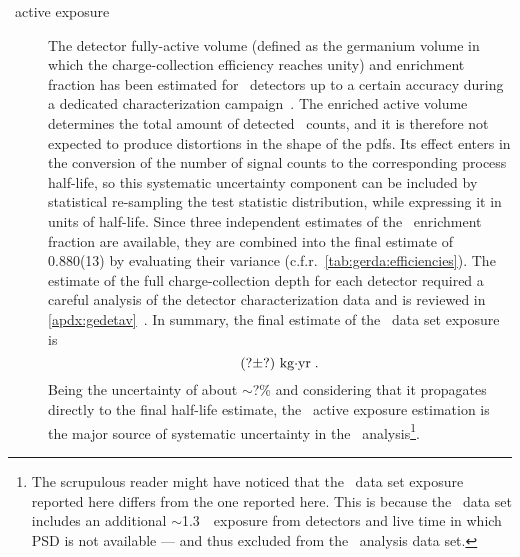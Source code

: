 \begin{description}
  \item[\gesix\ active exposure] The detector fully-active volume (defined
    as the germanium volume in which the charge-collection efficiency reaches unity) and
    enrichment fraction has been estimated for \bege\ detectors up to a certain accuracy
    during a dedicated characterization campaign~\cite{Agostini2015e, Agostini2019}. The
    enriched active volume determines the total amount of detected \nnbb\ counts, and it
    is therefore not expected to produce distortions in the shape of the pdfs. Its effect
    enters in the conversion of the number of signal counts to the corresponding process
    half-life, so this systematic uncertainty component can be included by statistical
    re-sampling the test statistic distribution, while expressing it in units of
    half-life.
    \newpar
    Since three independent estimates of the \bege\ enrichment fraction are
    available\cite{Agostini2015e}, they are combined into the final estimate of 0.880(13)
    by evaluating their variance (c.f.r.~\cref{tab:gerda:efficiencies}). The estimate of
    the full charge-collection depth for each detector required a careful analysis of the
    detector characterization data and is reviewed in
    \cref{apdx:gedetav}~\cite{Agostini2019, Lehnert2016}. In summary, the final estimate
    of the \enrBEGeII\ data set exposure is
    \[
      (? \pm ?)~\text{{kg$\cdot$yr}} \;.
    \]
    Being the uncertainty of about $\sim$?\% and considering that it propagates directly
    to the final half-life estimate, the \gesix\ active exposure estimation is the major
    source of systematic uncertainty in the \nnbb\ analysis\footnote{%
      The scrupulous reader might have noticed that the \bege\ data set exposure reported
      here differs from the one reported here. This is because the \enrBEGeII\ data set
      includes an additional $\sim$1.3~\kgyr\ exposure from detectors and live time in
      which PSD is not available --- and thus excluded from the \onbb\ analysis data set.
    }. 


\end{description}
